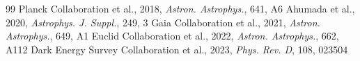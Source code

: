 \documentclass[11pt,a4paper]{article}
\begin{document}
\begin{thebibliography}{99}
 Planck Collaboration et al., 2018, \textit{Astron. Astrophys.}, 641, A6
 Ahumada et al., 2020, \textit{Astrophys. J. Suppl.}, 249, 3
 Gaia Collaboration et al., 2021, \textit{Astron. Astrophys.}, 649, A1
 Euclid Collaboration et al., 2022, \textit{Astron. Astrophys.}, 662, A112
 Dark Energy Survey Collaboration et al., 2023, \textit{Phys. Rev. D}, 108, 023504
\end{thebibliography}
\end{document}
